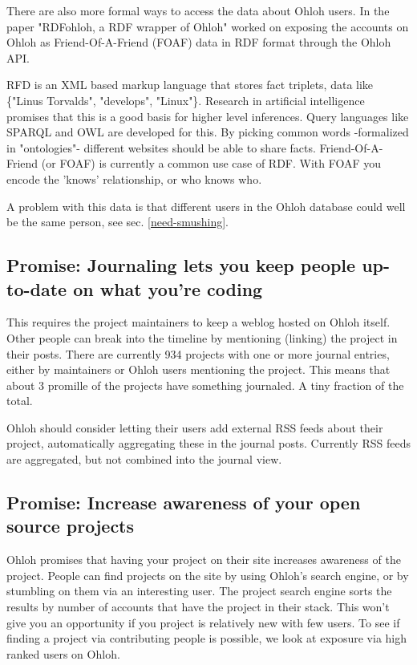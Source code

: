 \documentclass{sig-alternate}
\begin{document}
There are also more formal ways to access the data about Ohloh users. In the paper "RDFohloh, a RDF wrapper of Ohloh" \cite{Fernandez:2008p4488}  worked on exposing the accounts on Ohloh as Friend-Of-A-Friend (FOAF) data in RDF format through the Ohloh API.

RFD is an XML based markup language that stores fact triplets, data like \{"Linus Torvalds", "develops", "Linux"\}. Research in artificial intelligence promises that this is a good basis for higher level inferences. Query languages like SPARQL and OWL are developed for this. By picking common words -formalized in "ontologies"- different websites should be able to share facts. Friend-Of-A-Friend (or FOAF) is currently a common use case of RDF. With FOAF you encode the 'knows' relationship, or who knows who.

A problem with this data is that different users in the Ohloh database could well be the same person, see sec. \ref{need-smushing}.

\subsection{Promise: Journaling lets you keep people up-to-date on what you're coding}

This requires the project maintainers to keep a weblog hosted on Ohloh itself. Other people can break into the timeline by mentioning (linking) the project in their posts. There are currently 934 projects with one or more journal entries, either by maintainers or Ohloh users mentioning the project. This means that about 3 promille of the projects have something journaled. A tiny fraction of the total.

Ohloh should consider letting their users add external RSS feeds about their project, automatically aggregating these in the journal posts. Currently RSS feeds are aggregated, but not combined into the journal view.


\subsection{Promise: Increase awareness of your open source projects}
Ohloh promises that having your project on their site increases awareness of the project. People can find projects on the site by using Ohloh's search engine, or by stumbling on them via an interesting user. The project search engine sorts the results by number of accounts that have the project in their stack. This won't give you an opportunity if you project is relatively new with few users. To see if finding a project via contributing people is possible, we look at exposure via high ranked users on Ohloh.
\end{document}
